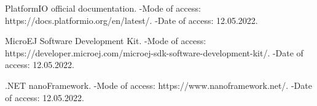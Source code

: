 \begin{thebibliography}{1}
	     PlatformIO official documentation. -Mode of access: \newline
	    https://docs.platformio.org/en/latest/. -Date of access: 12.05.2022.
	    
	     MicroEJ Software Development Kit. -Mode of access: \newline
	    https://developer.microej.com/microej-sdk-software-development-kit/. -Date of access: 12.05.2022.
	    
	     .NET nanoFramework. -Mode of access: \newline
	    https://www.nanoframework.net/. -Date of access: 12.05.2022.
	 	
	 \end{thebibliography}